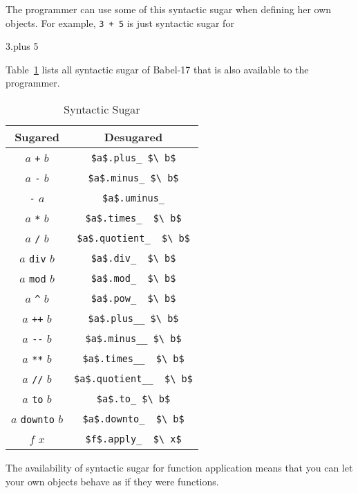 \documentclass[11pt]{amsart}
\newcommand{\babelsrc}[1] {\lstinline!#1!}
\begin{document}
The programmer can use some of this syntactic sugar when defining her own objects. For example, \texttt{3 + 5} is just syntactic sugar for 
\begin{babellisting}
3.plus 5
\end{babellisting} 
Table~\ref{tab:syntacticsugar} lists all syntactic sugar of Babel-17 that is also available to the programmer. 
\begin{table}
\caption{Syntactic Sugar}
\begin{tabular}{c|c}
\textbf{Sugared} & \textbf{Desugared} \\\hline\hline
$a$ \verb!+! $b$ & \babelsrc{$a$.plus_ $\ b$} \\\hline
$a$ \verb!-! $b$ & \babelsrc{$a$.minus_ $\ b$} \\\hline
\verb!-! $a$ & \babelsrc{$a$.uminus_} \\\hline
$a$ \verb!*! $b$ & \babelsrc{$a$.times_  $\ b$} \\\hline
$a$ \verb!/! $b$ & \babelsrc{$a$.quotient_  $\ b$} \\\hline
$a$ \verb!div! $b$ & \babelsrc{$a$.div_  $\ b$} \\\hline
$a$ \verb!mod! $b$ & \babelsrc{$a$.mod_  $\ b$} \\\hline
$a$ \verb+^+ $b$ & \babelsrc{$a$.pow_  $\ b$} \\\hline
$a$ \verb!++! $b$ & \babelsrc{$a$.plus__ $\ b$} \\\hline
$a$ \verb!--! $b$ & \babelsrc{$a$.minus__ $\ b$} \\\hline
$a$ \verb!**! $b$ & \babelsrc{$a$.times__  $\ b$}\\\hline
$a$ \verb!//! $b$ & \babelsrc{$a$.quotient__  $\ b$}\\\hline
$a$ \verb!to! $b$ & \babelsrc{$a$.to_ $\ b$}\\\hline
$a$ \verb!downto! $b$ & \babelsrc{$a$.downto_  $\ b$}\\\hline
$f$ $x$ &  \babelsrc{$f$.apply_  $\ x$}
\end{tabular}
\label{tab:syntacticsugar}
\end{table}
The availability of syntactic sugar for function application means that you can let your own objects behave as if they were functions. 
\end{document}
